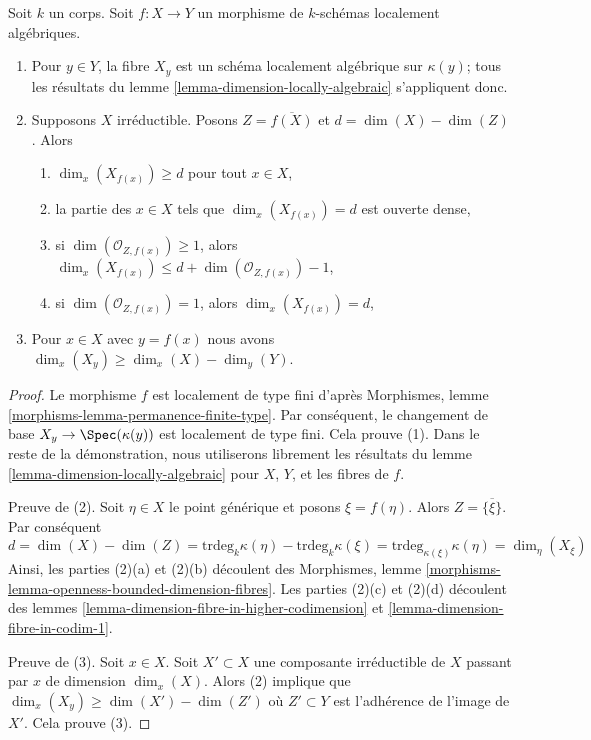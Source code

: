\begin{lemma}
\label{lemma-dimension-fibres-locally-algebraic}
Soit $k$ un corps. Soit $f : X \to Y$ un morphisme de
$k$-schémas localement algébriques.
\begin{enumerate}
\item Pour $y \in Y$, la fibre $X_y$ est un schéma localement
algébrique sur $\kappa(y)$; tous les résultats du
lemme \ref{lemma-dimension-locally-algebraic} s'appliquent donc.
\item Supposons $X$ irréductible. Posons $Z = \overline{f(X)}$ et
$d = \dim(X) - \dim(Z)$. Alors
\begin{enumerate}
\item $\dim_x(X_{f(x)}) \geq d$ pour tout $x \in X$,
\item la partie des $x \in X$ tels que $\dim_x(X_{f(x)}) = d$ est ouverte dense,
\item si $\dim(\mathcal{O}_{Z, f(x)}) \geq 1$, alors
$\dim_x(X_{f(x)}) \leq d + \dim(\mathcal{O}_{Z, f(x)}) - 1$,
\item si $\dim(\mathcal{O}_{Z, f(x)}) = 1$, alors $\dim_x(X_{f(x)}) = d$,
\end{enumerate}
\item Pour $x \in X$ avec $y = f(x)$ nous
avons $\dim_x(X_y) \geq \dim_x(X) - \dim_y(Y)$.
\end{enumerate}
\end{lemma}

\begin{proof}
Le morphisme $f$ est localement de type fini d'après
Morphismes, lemme
\ref{morphisms-lemma-permanence-finite-type}. Par conséquent,
le changement de base $X_y \to \Spec(\kappa(y))$ est localement
de type fini. Cela prouve (1). Dans le reste de la
démonstration, nous utiliserons librement les résultats du lemme
\ref{lemma-dimension-locally-algebraic} pour $X$, $Y$, et les fibres de $f$.

\medskip\noindent
Preuve de (2). Soit $\eta \in X$ le point générique et
posons $\xi = f(\eta)$. Alors $Z = \overline{\{\xi\}}$. Par conséquent
$$
d = \dim(X) - \dim(Z) =
\text{trdeg}_k \kappa(\eta) - \text{trdeg}_k \kappa(\xi) =
\text{trdeg}_{\kappa(\xi)} \kappa(\eta) = \dim_\eta(X_\xi)
$$
Ainsi, les parties (2)(a) et (2)(b) découlent des
Morphismes, lemme
\ref{morphisms-lemma-openness-bounded-dimension-fibres}. Les
parties (2)(c) et (2)(d) découlent des lemmes
\ref{lemma-dimension-fibre-in-higher-codimension} et \ref{lemma-dimension-fibre-in-codim-1}.

\medskip\noindent
Preuve de (3). Soit $x \in X$. Soit $X' \subset X$ une
composante irréductible de $X$ passant par $x$ de dimension
$\dim_x(X)$. Alors (2) implique que $\dim_x(X_y) \geq \dim(X') -
\dim(Z')$ où $Z' \subset Y$ est l'adhérence de l'image de $X'$. Cela prouve (3).
\end{proof}

